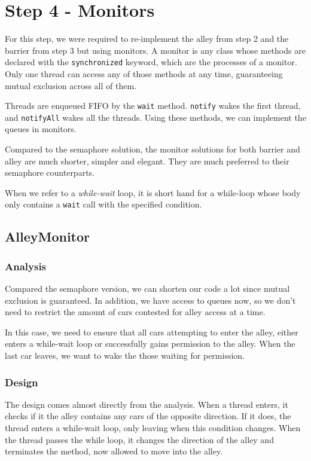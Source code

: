 \section{Step 4 - Monitors}
For this step, we were required to re-implement the alley from step 2 and the barrier from step 3 but using monitors. A monitor is any class whose methods are declared with the \texttt{synchronized} keyword, which are the processes of a monitor. Only one thread can access any of those methods at any time, guaranteeing mutual exclusion across all of them.

Threads are enqueued FIFO by the \texttt{wait} method. \texttt{notify} wakes the first thread, and \texttt{notifyAll} wakes all the threads. Using these methods, we can implement the queues in monitors.

Compared to the semaphore solution, the monitor solutions for both barrier and alley are much shorter, simpler and elegant. They are much preferred to their semaphore counterparts.

When we refer to a \emph{while-wait} loop, it is short hand for a while-loop whose body only contains a \texttt{wait} call with the specified condition.

\subsection{AlleyMonitor}
\subsubsection{Analysis}
Compared the semaphore version, we can shorten our code a lot since mutual exclusion is guaranteed. In addition, we have access to queues now, so we don't need to restrict the amount of cars contested for alley access at a time.

In this case, we need to ensure that all cars attempting to enter the alley, either enters a while-wait loop or successfully gains permission to the alley. When the last car leaves, we want to wake the those waiting for permission.

\subsubsection{Design}
The design comes almost directly from the analysis. When a thread enters, it checks if it the alley contains any cars of the opposite direction. If it does, the thread enters a while-wait loop, only leaving when this condition changes. When the thread passes the while loop, it changes the direction of the alley and terminates the method, now allowed to move into the alley.

